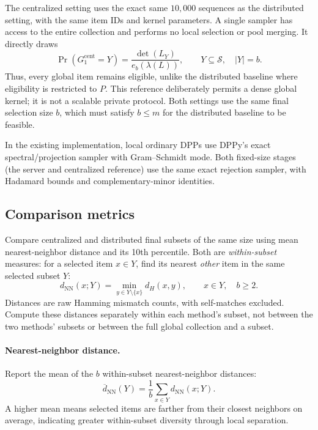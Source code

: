\documentclass[11pt]{article}
\newcommand{\card}[1]{\left\lvert#1\right\rvert}
\begin{document}
The centralized setting uses the exact same $10{,}000$ sequences as the
distributed setting, with the same item IDs and kernel
parameters. A single sampler has access to the entire collection and performs
no local selection or pool merging. It directly draws
\begin{equation}
  \Pr(G_1^{\mathrm{cent}}=Y)
  =\frac{\det(L_Y)}{e_b(\lambda(L))},
  \qquad Y\subseteq\mathcal{S},\quad \card{Y}=b.
  \label{eq:baseline-centralized-kdpp}
\end{equation}
Thus, every global item remains eligible, unlike the distributed baseline
where eligibility is restricted to $P$. This reference deliberately permits
a dense global kernel; it is not a scalable private protocol. Both settings
use the same final selection size $b$, which must satisfy $b\le m$ for the
distributed baseline to be feasible.

In the existing implementation, local ordinary DPPs use DPPy's exact
spectral/projection sampler with Gram--Schmidt mode. Both fixed-size stages
(the server and centralized reference) use the same exact rejection sampler,
with Hadamard bounds and complementary-minor identities.
\subsection{Comparison metrics}

Compare centralized and distributed final subsets of the same size using
mean nearest-neighbor distance and its 10th percentile. Both are
\emph{within-subset} measures: for a selected item $x\in Y$, find its
nearest \emph{other} item in the same selected subset $Y$:
\begin{equation}
  d_{\mathrm{NN}}(x;Y)
  =\min_{y\in Y\setminus\{x\}} d_H(x,y),
  \qquad x\in Y,\quad b\ge2.
  \label{eq:baseline-within-nn}
\end{equation}
Distances are raw Hamming mismatch counts, with self-matches excluded.
Compute these distances separately within each method's subset, not between
the two methods' subsets or between the full global collection and a subset.

\paragraph{Nearest-neighbor distance.}
Report the mean of the $b$ within-subset nearest-neighbor distances:
\begin{equation}
  \overline d_{\mathrm{NN}}(Y)
  =\frac{1}{b}\sum_{x\in Y} d_{\mathrm{NN}}(x;Y).
  \label{eq:baseline-mean-nn}
\end{equation}
A higher mean means selected items are farther from their closest neighbors
on average, indicating greater within-subset diversity through local
separation.
\end{document}
